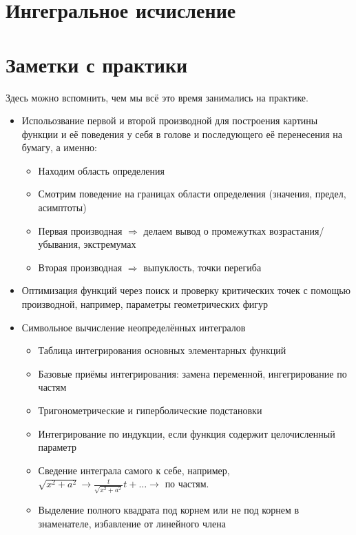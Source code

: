\documentclass[12pt, a4paper]{article}
\begin{document}
  \section{Ингегральное исчисление}

  


  
  \section{Заметки с практики}\label{practice-notes}

  Здесь можно вспомнить, чем мы всё это время занимались на практике.

  \begin{itemize}
    \item Испольозвание первой и второй производной для построения картины функции и её поведения 
    у себя в голове и последующего её перенесения на бумагу, а именно:
    \begin{itemize}
      \item Находим область определения
      \item Смотрим поведение на границах области определения (значения, предел, асимптоты)
      \item Первая производная $\Longrightarrow$ делаем вывод о промежутках возрастания/убывания, экстремумах
      \item Вторая производная $\Longrightarrow$ выпуклость, точки перегиба
    \end{itemize}
    \item Оптимизация функций через поиск и проверку критических точек с помощью производной, например, параметры геометрических фигур
    \item Символьное вычисление неопределённых интегралов
    \begin{itemize}
      \item Таблица интегрирования основных элементарных функций
      \item Базовые приёмы интегрирования: замена переменной, ингегрирование по частям
      \item Тригонометрические и гиперболические подстановки
      \item Интегрирование по индукции, если функция содержит целочисленный параметр
      \item Сведение интеграла самого к себе, например, $\sqrt{x^2 + a^2} \rightarrow \frac{t}{\sqrt{x^2 + a^2}} t + \ldots \rightarrow$ по частям.
      \item Выделение полного квадрата под корнем или не под корнем в знаменателе, избавление от линейного члена

\end{itemize}
\end{itemize}
\end{document}
